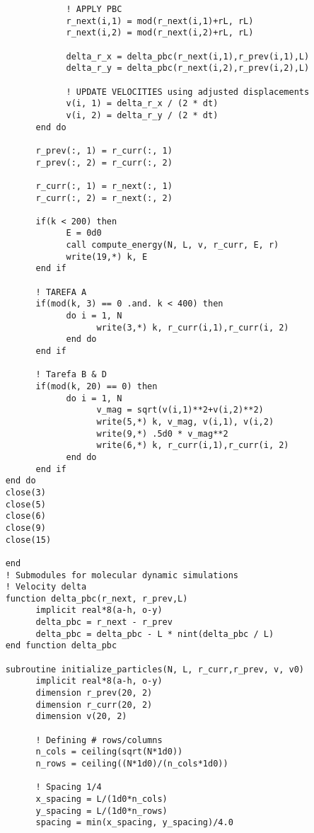 \begin{verbatim}
                ! APPLY PBC
                r_next(i,1) = mod(r_next(i,1)+rL, rL)
                r_next(i,2) = mod(r_next(i,2)+rL, rL)

                delta_r_x = delta_pbc(r_next(i,1),r_prev(i,1),L)
                delta_r_y = delta_pbc(r_next(i,2),r_prev(i,2),L)

                ! UPDATE VELOCITIES using adjusted displacements
                v(i, 1) = delta_r_x / (2 * dt)
                v(i, 2) = delta_r_y / (2 * dt)
          end do

          r_prev(:, 1) = r_curr(:, 1)
          r_prev(:, 2) = r_curr(:, 2)
          
          r_curr(:, 1) = r_next(:, 1)
          r_curr(:, 2) = r_next(:, 2)
          
          if(k < 200) then 
                E = 0d0
                call compute_energy(N, L, v, r_curr, E, r)
                write(19,*) k, E
          end if

          ! TAREFA A 
          if(mod(k, 3) == 0 .and. k < 400) then
                do i = 1, N 
                      write(3,*) k, r_curr(i,1),r_curr(i, 2)
                end do
          end if

          ! Tarefa B & D 
          if(mod(k, 20) == 0) then
                do i = 1, N
                      v_mag = sqrt(v(i,1)**2+v(i,2)**2)
                      write(5,*) k, v_mag, v(i,1), v(i,2)
                      write(9,*) .5d0 * v_mag**2
                      write(6,*) k, r_curr(i,1),r_curr(i, 2)
                end do
          end if
    end do
    close(3)
    close(5)
    close(6)
    close(9)
    close(15) 

    end
    ! Submodules for molecular dynamic simulations
    ! Velocity delta 
    function delta_pbc(r_next, r_prev,L)
          implicit real*8(a-h, o-y)
          delta_pbc = r_next - r_prev
          delta_pbc = delta_pbc - L * nint(delta_pbc / L)
    end function delta_pbc

    subroutine initialize_particles(N, L, r_curr,r_prev, v, v0)
          implicit real*8(a-h, o-y)
          dimension r_prev(20, 2)
          dimension r_curr(20, 2)
          dimension v(20, 2)
         
          ! Defining # rows/columns 
          n_cols = ceiling(sqrt(N*1d0))
          n_rows = ceiling((N*1d0)/(n_cols*1d0)) 
          
          ! Spacing 1/4 
          x_spacing = L/(1d0*n_cols)
          y_spacing = L/(1d0*n_rows)
          spacing = min(x_spacing, y_spacing)/4.0 
          

\end{verbatim}
